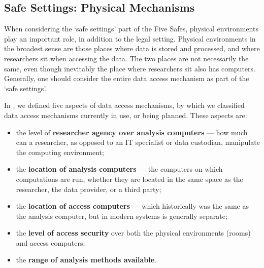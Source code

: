 

\subsection{Safe Settings: Physical Mechanisms}

When considering the `safe settings' part of the Five Safes, physical environments play an important role, in addition to the legal setting. Physical environments in the broadest sense are those places where data is stored and processed, and where researchers sit when accessing the data. The two places are not necessarily the same, even though inevitably the place where researchers sit also has computers. Generally, one should consider the entire data access mechanism as part of the `safe settings'.

In \cite{shen_physically_2021}, we defined five aspects of data access mechanisms, by which we classified data access mechanisms currently in use, or being planned. These aspects are:
\begin{itemize}
    \item the level of \textbf{researcher agency over analysis computers} --- how much can a researcher, as opposed to an IT specialist or data custodian, manipulate the computing environment;
    \item the \textbf{location of analysis computers} --- the computers on which computations are run, whether they are located in the same space as the researcher, the data provider, or a third party;
    \item the \textbf{location of access computers} --- which historically was the same as the analysis computer, but in modern systems is generally separate;
    \item the \textbf{level of access security} over both the physical environments (rooms) and access computers;
    \item the \textbf{range of analysis methods available}.
\end{itemize}

